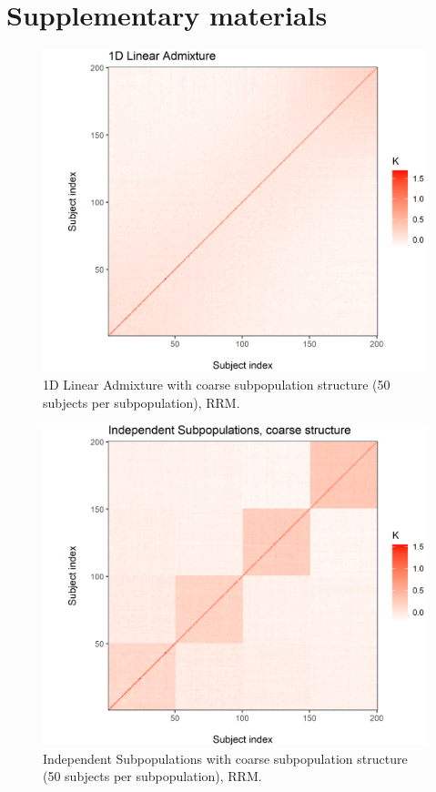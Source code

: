\section{Supplementary materials}

\begin{figure}[H]
    \centering
    \includegraphics[scale = 1]{figures/admixed_kinship.png}
    \caption{1D Linear Admixture with coarse subpopulation structure (50 subjects per subpopulation), RRM.}
    \label{fig:admixed}
\end{figure}

\begin{figure}[H]
    \centering
    \includegraphics[scale = 1]{figures/indep_coarse_kinship.png}
    \caption{Independent Subpopulations with coarse subpopulation structure (50 subjects per subpopulation), RRM.}
    \label{fig:indep_coarse}
\end{figure}

